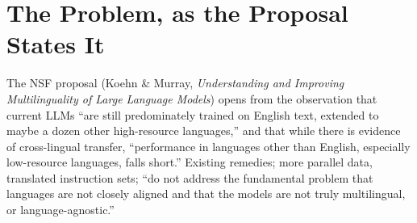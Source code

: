 \documentclass[11pt,a4paper]{article}
\begin{document}
\begin{abstract}
families after the same controls (Spearman 0.508, model-bootstrap 95 percent
interval $[0.19, 0.71]$; four-model pilot 0.84); (8)~a frozen prospective test on
two unseen families passed 4 of 4 predictions; (9)~synthetic and trained
interventions locate the construct boundary: every scale-invariant
measure, LFS included, is blind to uniform collapse by construction; a
trained condition that lost 95 percent of its raw concept variance moved LFS by
0.05 while every retrieval-based measure computed alongside it improved; and
minimizing LFS as a loss reverses its
observational association with alignment. The Aim~1 deliverable is therefore
a \textbf{family of measures}, each answering one question and none averaged
into a score: the LFS profile, its raw components, the mapping-complexity
map sequence, the English-hub test, and the tail measure. This is the plural the
proposal asks for in \S3.1.4, ``metrics,'' each tied to the question it
answers. Published measures such as MEXA are related work, computed alongside
for reference where a reader would expect them; no measure is ranked against
another anywhere in this report. For Aim~2 the family's demonstrated role is the design,
monitoring, and evaluation of interventions, not the training objective.
\end{abstract}

\tableofcontents

\section{The Problem, as the Proposal States It}
The NSF proposal (Koehn \& Murray, \emph{Understanding and Improving
Multilinguality of Large Language Models}) opens from the observation that
current LLMs ``are still predominately trained on English text, extended to
maybe a dozen other high-resource languages,'' and that while there is
evidence of cross-lingual transfer, ``performance in languages other than
English, especially low-resource languages, falls short.'' Existing remedies; more parallel data, translated instruction sets; ``do not address the
fundamental problem that languages are not closely aligned and that the
models are not truly multilingual, or language-agnostic.''
\end{document}
